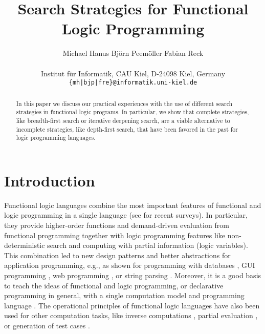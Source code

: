 \documentclass[english]{lni}
\author{
Michael Hanus
\quad
Bj{\"o}rn Peem{\"o}ller
\quad
Fabian Reck \\
\\
Institut f\"ur Informatik, CAU Kiel, D-24098 Kiel, Germany \\
\texttt{\{mh|bjp|fre\}@informatik.uni-kiel.de}
}
\title{Search Strategies for Functional Logic Programming}
\begin{document}
\maketitle

\begin{abstract}
In this paper we discuss our practical experiences
with the use of different search strategies
in functional logic programs.
In particular, we show that complete strategies,
like breadth-first search or iterative deepening search,
are a viable alternative to incomplete strategies, like depth-first
search, that have been favored in the past for logic programming languages.
\end{abstract}

\section{Introduction}

Functional logic languages combine the most important
features of functional and logic programming in a single language
(see \cite{AntoyHanus10CACM,Hanus07ICLP} for recent surveys).
In particular, they provide higher-order functions and demand-driven
evaluation from functional programming together with logic programming features
like non-deterministic search and computing with partial information
(logic variables).
This combination
led to new design patterns \cite{AntoyHanus02FLOPS,AntoyHanus11WFLP}
and better abstractions for application programming,
e.g., as shown for programming with databases
\cite{BrasselHanusMueller08PADL,Fischer05},
GUI programming \cite{Hanus00PADL},
web programming \cite{Hanus01PADL,Hanus06PPDP,HanusKoschnicke10PADL},
or string parsing \cite{CaballeroLopez99}.
Moreover, it is a good basis
to teach the ideas of functional and logic programming,
or declarative programming in general,
with a single computation model and programming language
\cite{Hanus97DPLE}.
The operational principles of functional logic languages
have also been used for other computation tasks,
like inverse computations \cite{AbramovGlueckKlimov06},
partial evaluation \cite{AlpuenteFalaschiVidal98TOPLAS}, or
generation of test cases \cite{FischerKuchen07,RuncimanNaylorLindblad08}.
\end{document}

